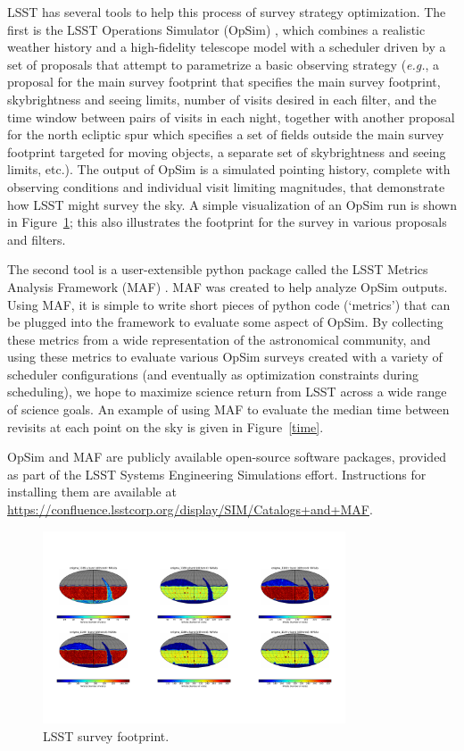 \documentclass{iau}
\begin{document}
LSST has several tools to help this process of survey strategy
optimization. The first is the LSST Operations Simulator (OpSim) \cite{opsim},
which combines a realistic weather history and a high-fidelity
telescope model with a scheduler driven by a set of proposals that
attempt to parametrize a basic observing strategy ({\it e.g.}, a
proposal for the main survey footprint that specifies the main survey footprint,
skybrightness and seeing limits, number of visits desired in each
filter, and the time window between pairs of visits in each night,
together with another proposal for the north ecliptic spur which
specifies a set of fields outside the main survey footprint targeted
for moving objects, a separate set of skybrightness and seeing limits,
etc.). The output of OpSim is a simulated pointing history, complete
with observing conditions and individual visit limiting magnitudes,
that demonstrate how LSST might survey the sky. A simple visualization
of an OpSim run is shown in Figure~\ref{footprint}; this also
illustrates the footprint for the survey in various proposals and
filters.

The second tool is a user-extensible python package called the LSST
Metrics Analysis Framework (MAF) \cite{maf}. MAF was created to help
analyze OpSim outputs. Using MAF, it is simple to write short pieces
of python code (`metrics') that can be plugged into the framework to
evaluate some aspect of OpSim. By collecting these metrics from a wide
representation of the astronomical community, and using these metrics
to evaluate various OpSim surveys created with a variety of scheduler
configurations (and eventually as optimization constraints during
scheduling), we hope to maximize science return from LSST across a
wide range of science goals. An example of using MAF to evaluate the
median time between revisits at each point on the sky is given in
Figure~\ref{time}.

OpSim and MAF are publicly available open-source software packages,
provided as part of the LSST Systems Engineering Simulations
effort. Instructions for installing them are available at
\url{https://confluence.lsstcorp.org/display/SIM/Catalogs+and+MAF}. 

\begin{figure}
\centering
\includegraphics[width=0.8\textwidth]{nvisits}
\caption{LSST survey footprint. 
\label{footprint}}
\end{figure}
\end{document}
